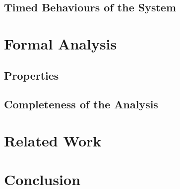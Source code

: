 \documentclass{llncs}
\begin{document}
\subsection{Timed Behaviours of the System}

\section{Formal Analysis}
\subsection{Properties}
\subsection{Completeness of the Analysis}

\section{Related Work}

\section{Conclusion}
\end{document}
